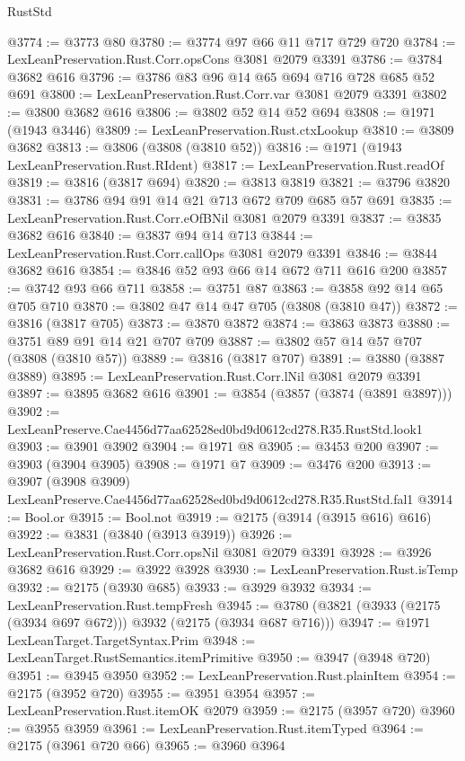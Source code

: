 \begin{lexlean}{RustStd}
\begin{coremodule}
@3774 := @3773 @80
@3780 := @3774 @97 @66 @11 @717 @729 @720
@3784 := LexLeanPreservation.Rust.Corr.opsCons @3081 @2079 @3391
@3786 := @3784 @3682 @616
@3796 := @3786 @83 @96 @14 @65 @694 @716 @728 @685 @52 @691
@3800 := LexLeanPreservation.Rust.Corr.var @3081 @2079 @3391
@3802 := @3800 @3682 @616
@3806 := @3802 @52 @14 @52 @694
@3808 := @1971 (@1943 @3446)
@3809 := LexLeanPreservation.Rust.ctxLookup
@3810 := @3809 @3682
@3813 := @3806 (@3808 (@3810 @52))
@3816 := @1971 (@1943 LexLeanPreservation.Rust.RIdent)
@3817 := LexLeanPreservation.Rust.readOf
@3819 := @3816 (@3817 @694)
@3820 := @3813 @3819
@3821 := @3796 @3820
@3831 := @3786 @94 @91 @14 @21 @713 @672 @709 @685 @57 @691
@3835 := LexLeanPreservation.Rust.Corr.eOfBNil @3081 @2079 @3391
@3837 := @3835 @3682 @616
@3840 := @3837 @94 @14 @713
@3844 := LexLeanPreservation.Rust.Corr.callOps @3081 @2079 @3391
@3846 := @3844 @3682 @616
@3854 := @3846 @52 @93 @66 @14 @672 @711 @616 @200
@3857 := @3742 @93 @66 @711
@3858 := @3751 @87
@3863 := @3858 @92 @14 @65 @705 @710
@3870 := @3802 @47 @14 @47 @705 (@3808 (@3810 @47))
@3872 := @3816 (@3817 @705)
@3873 := @3870 @3872
@3874 := @3863 @3873
@3880 := @3751 @89 @91 @14 @21 @707 @709
@3887 := @3802 @57 @14 @57 @707 (@3808 (@3810 @57))
@3889 := @3816 (@3817 @707)
@3891 := @3880 (@3887 @3889)
@3895 := LexLeanPreservation.Rust.Corr.lNil @3081 @2079 @3391
@3897 := @3895 @3682 @616
@3901 := @3854 (@3857 (@3874 (@3891 @3897)))
@3902 := LexLeanPreserve.Cae4456d77aa62528ed0bd9d0612cd278.R35.RustStd.look1
@3903 := @3901 @3902
@3904 := @1971 @8
@3905 := @3453 @200
@3907 := @3903 (@3904 @3905)
@3908 := @1971 @7
@3909 := @3476 @200
@3913 := @3907 (@3908 @3909) LexLeanPreserve.Cae4456d77aa62528ed0bd9d0612cd278.R35.RustStd.fal1
@3914 := Bool.or
@3915 := Bool.not
@3919 := @2175 (@3914 (@3915 @616) @616)
@3922 := @3831 (@3840 (@3913 @3919))
@3926 := LexLeanPreservation.Rust.Corr.opsNil @3081 @2079 @3391
@3928 := @3926 @3682 @616
@3929 := @3922 @3928
@3930 := LexLeanPreservation.Rust.isTemp
@3932 := @2175 (@3930 @685)
@3933 := @3929 @3932
@3934 := LexLeanPreservation.Rust.tempFresh
@3945 := @3780 (@3821 (@3933 (@2175 (@3934 @697 @672))) @3932 (@2175 (@3934 @687 @716)))
@3947 := @1971 LexLeanTarget.TargetSyntax.Prim
@3948 := LexLeanTarget.RustSemantics.itemPrimitive
@3950 := @3947 (@3948 @720)
@3951 := @3945 @3950
@3952 := LexLeanPreservation.Rust.plainItem
@3954 := @2175 (@3952 @720)
@3955 := @3951 @3954
@3957 := LexLeanPreservation.Rust.itemOK @2079
@3959 := @2175 (@3957 @720)
@3960 := @3955 @3959
@3961 := LexLeanPreservation.Rust.itemTyped
@3964 := @2175 (@3961 @720 @66)
@3965 := @3960 @3964

\end{coremodule}
\end{lexlean}
